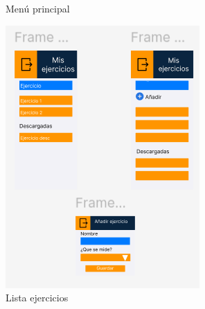 \begin{figure}[H]
\begin{minipage}[b]{0.35\textwidth}
    \caption{Menú principal}
    \label{fig:Menu principal}
  \end{minipage}
  \begin{minipage}[b]{0.45\textwidth}
    \centering
    \includegraphics[width=\textwidth]{fotos/ListaEjercicios.png}
    \caption{Lista ejercicios}
    \label{fig:Lista ejercicios}
  \end{minipage}
  \begin{minipage}[b]{0.45\textwidth}
    \centering

\end{minipage}
\end{figure}
